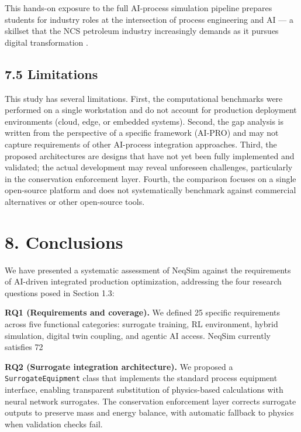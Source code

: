 \documentclass[review,3p]{custom}
\begin{document}
This hands-on exposure to the full AI-process simulation pipeline prepares students for industry roles at the intersection of process engineering and AI --- a skillset that the NCS petroleum industry increasingly demands as it pursues digital transformation \cite{Equinor2024, NorwegianClimate2021}.

\subsection{7.5 Limitations}

This study has several limitations. First, the computational benchmarks were performed on a single workstation and do not account for production deployment environments (cloud, edge, or embedded systems). Second, the gap analysis is written from the perspective of a specific framework (AI-PRO) and may not capture requirements of other AI-process integration approaches. Third, the proposed architectures are designs that have not yet been fully implemented and validated; the actual development may reveal unforeseen challenges, particularly in the conservation enforcement layer. Fourth, the comparison focuses on a single open-source platform and does not systematically benchmark against commercial alternatives or other open-source tools.


\section{8. Conclusions}

We have presented a systematic assessment of NeqSim against the requirements of AI-driven integrated production optimization, addressing the four research questions posed in Section 1.3:

\textbf{RQ1 (Requirements and coverage).} We defined 25 specific requirements across five functional categories: surrogate training, RL environment, hybrid simulation, digital twin coupling, and agentic AI access. NeqSim currently satisfies 72%

\textbf{RQ2 (Surrogate integration architecture).} We proposed a \texttt{SurrogateEquipment} class that implements the standard process equipment interface, enabling transparent substitution of physics-based calculations with neural network surrogates. The conservation enforcement layer corrects surrogate outputs to preserve mass and energy balance, with automatic fallback to physics when validation checks fail.
\end{document}
